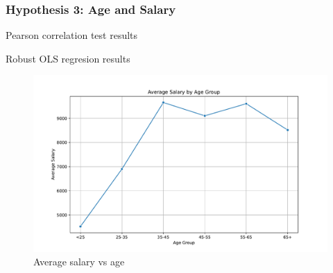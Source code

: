 \subsubsection{Hypothesis 3: Age and Salary}

\begin{table}[H]
    \centering
    \caption{Pearson correlation test results}
    \label{tab:pearson correlation test results}
    \begin{minipage}{\columnwidth}
        
    \end{minipage}
\end{table}

\begin{table}[H]
    \centering
    \scriptsize
    \caption{Robust OLS regresion results}
    \label{tab:robust ols regression test results}
    \begin{minipage}{\columnwidth}
        \centering
        
    \end{minipage}
\end{table}

\begin{figure}[H]
    \centering
    \includegraphics[width=\columnwidth]{images/hyp_3_average_salary.pdf} %
    \caption{Average salary vs age}
    \label{fig:Average salary by age scatter plot}
\end{figure}

